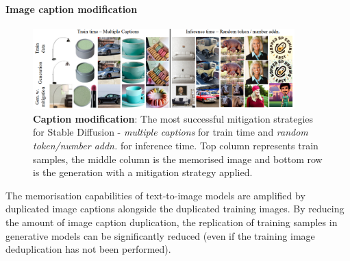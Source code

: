 \documentclass[conference]{IEEEtran}
\begin{document}

\paragraph{Image caption modification} %
\begin{figure}
    \centering
    \includegraphics[width=0.9\textwidth]{figures/caption-modification.PNG}
    \caption{\textbf{Caption modification}: The most successful mitigation strategies for Stable Diffusion - \textit{multiple captions} for train time and \textit{random token/number addn.} for inference time. Top column represents train samples, the middle column is the memorised image and bottom row is the generation with a mitigation strategy applied.~\cite{somepalli_understanding_2023}}
    \label{fig:caption-modification}
\end{figure}
The memorisation capabilities of text-to-image models are amplified by duplicated image captions alongside the duplicated training images. 
By reducing the amount of image caption duplication, the replication of training samples in generative models can be significantly reduced (even if the training image deduplication has not been performed). 
\end{document}
